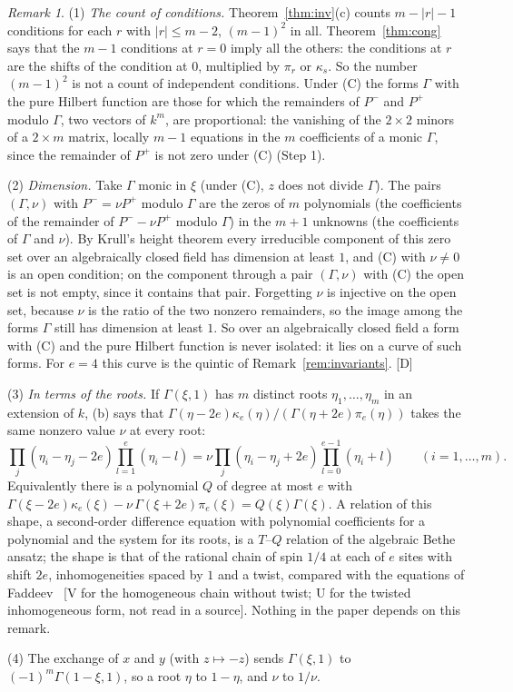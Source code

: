 \documentclass[11pt]{article}
\theoremstyle{definition}
\theoremstyle{remark}
\newtheorem{remark}{Remark}
\begin{document}
\begin{remark}\label{rem:cong}
(1) \emph{The count of conditions.} Theorem~\ref{thm:inv}(c) counts $m-|r|-1$ conditions for each $r$ with $|r|\le m-2$, $(m-1)^2$ in all. Theorem~\ref{thm:cong} says that the $m-1$ conditions at $r=0$ imply all the others: the conditions at $r$ are the shifts of the condition at $0$, multiplied by $\pi_r$ or $\kappa_s$. So the number $(m-1)^2$ is not a count of independent conditions. Under (C) the forms $\Gamma$ with the pure Hilbert function are those for which the remainders of $P^-$ and $P^+$ modulo $\Gamma$, two vectors of $k^m$, are proportional: the vanishing of the $2\times2$ minors of a $2\times m$ matrix, locally $m-1$ equations in the $m$ coefficients of a monic $\Gamma$, since the remainder of $P^+$ is not zero under (C) (Step 1).

(2) \emph{Dimension.} Take $\Gamma$ monic in $\xi$ (under (C), $z$ does not divide $\Gamma$). The pairs $(\Gamma,\nu)$ with $P^-=\nu P^+$ modulo $\Gamma$ are the zeros of $m$ polynomials (the coefficients of the remainder of $P^--\nu P^+$ modulo $\Gamma$) in the $m+1$ unknowns (the coefficients of $\Gamma$ and $\nu$). By Krull's height theorem every irreducible component of this zero set over an algebraically closed field has dimension at least $1$, and (C) with $\nu\ne0$ is an open condition; on the component through a pair $(\Gamma,\nu)$ with (C) the open set is not empty, since it contains that pair. Forgetting $\nu$ is injective on the open set, because $\nu$ is the ratio of the two nonzero remainders, so the image among the forms $\Gamma$ still has dimension at least $1$. So over an algebraically closed field a form with (C) and the pure Hilbert function is never isolated: it lies on a curve of such forms. For $e=4$ this curve is the quintic of Remark~\ref{rem:invariants}. [D]

(3) \emph{In terms of the roots.} If $\Gamma(\xi,1)$ has $m$ distinct roots $\eta_1,\dots,\eta_m$ in an extension of $k$, (b) says that $\Gamma(\eta-2e)\kappa_e(\eta)/(\Gamma(\eta+2e)\pi_e(\eta))$ takes the same nonzero value $\nu$ at every root:
\[
\prod_j(\eta_i-\eta_j-2e)\prod_{l=1}^{e}(\eta_i-l)=\nu\prod_j(\eta_i-\eta_j+2e)\prod_{l=0}^{e-1}(\eta_i+l)\qquad(i=1,\dots,m).
\]
Equivalently there is a polynomial $Q$ of degree at most $e$ with $\Gamma(\xi-2e)\kappa_e(\xi)-\nu\,\Gamma(\xi+2e)\pi_e(\xi)=Q(\xi)\Gamma(\xi)$. A relation of this shape, a second-order difference equation with polynomial coefficients for a polynomial and the system for its roots, is a $T$--$Q$ relation of the algebraic Bethe ansatz; the shape is that of the rational chain of spin $1/4$ at each of $e$ sites with shift $2e$, inhomogeneities spaced by $1$ and a twist, compared with the equations of Faddeev~\cite{Faddeev} [V for the homogeneous chain without twist; U for the twisted inhomogeneous form, not read in a source]. Nothing in the paper depends on this remark.

(4) The exchange of $x$ and $y$ (with $z\mapsto-z$) sends $\Gamma(\xi,1)$ to $(-1)^m\Gamma(1-\xi,1)$, so a root $\eta$ to $1-\eta$, and $\nu$ to $1/\nu$.
\end{remark}
\end{document}
